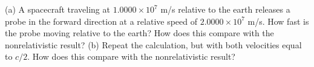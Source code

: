 (a) A spacecraft traveling at $1.0000\times10^7$ m/s
relative to the earth releases a probe in the forward
direction at a relative speed of $2.0000\times10^7$ m/s. How
fast is the probe moving relative to the earth? How does
this compare with the nonrelativistic result? \answercheck\hwendpart
(b) Repeat the
calculation, but with both velocities equal to $c/2$. How does
this compare with the nonrelativistic result?\answercheck
